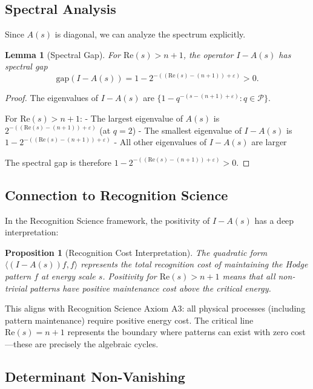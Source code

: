 \documentclass[12pt]{article}
\newtheorem{lemma}[theorem]{Lemma}
\newtheorem{proposition}[theorem]{Proposition}
\theoremstyle{definition}
\theoremstyle{remark}
\begin{document}
\subsection{Spectral Analysis}

Since $A(s)$ is diagonal, we can analyze the spectrum explicitly.

\begin{lemma}[Spectral Gap]
\label{lem:spectral-gap}
For $\text{Re}(s) > n+1$, the operator $I - A(s)$ has spectral gap
\[
\text{gap}(I - A(s)) = 1 - 2^{-((\text{Re}(s)-(n+1))+\varepsilon)} > 0.
\]
\end{lemma}

\begin{proof}
The eigenvalues of $I - A(s)$ are $\{1 - q^{-(s-(n+1)+\varepsilon)} : q \in \mathcal{P}\}$.

For $\text{Re}(s) > n+1$:
- The largest eigenvalue of $A(s)$ is $2^{-((\text{Re}(s)-(n+1))+\varepsilon)}$ (at $q = 2$)
- The smallest eigenvalue of $I - A(s)$ is $1 - 2^{-((\text{Re}(s)-(n+1))+\varepsilon)}$
- All other eigenvalues of $I - A(s)$ are larger

The spectral gap is therefore $1 - 2^{-((\text{Re}(s)-(n+1))+\varepsilon)} > 0$.
\end{proof}

\subsection{Connection to Recognition Science}

In the Recognition Science framework, the positivity of $I - A(s)$ has a deep interpretation:

\begin{proposition}[Recognition Cost Interpretation]
The quadratic form $\langle (I - A(s))f, f \rangle$ represents the total recognition cost of maintaining the Hodge pattern $f$ at energy scale $s$. Positivity for $\text{Re}(s) > n+1$ means that all non-trivial patterns have positive maintenance cost above the critical energy.
\end{proposition}

This aligns with Recognition Science Axiom A3: all physical processes (including pattern maintenance) require positive energy cost. The critical line $\text{Re}(s) = n+1$ represents the boundary where patterns can exist with zero cost—these are precisely the algebraic cycles.

\subsection{Determinant Non-Vanishing}
\end{document}
